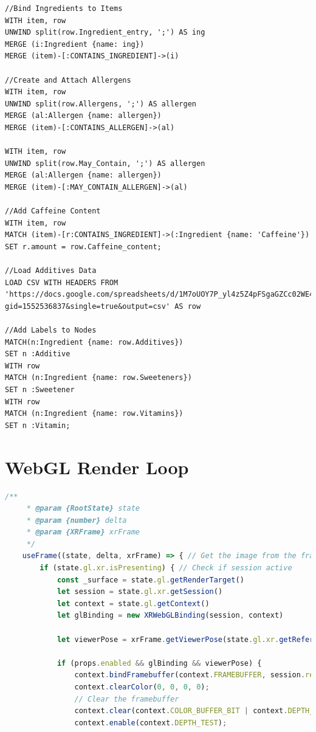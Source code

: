 \documentclass[thesis]{fputhesis}
\begin{document}
\begin{body}
\begin{appendices}
\begin{lstlisting}[language=Cypher]
//Bind Ingredients to Items
WITH item, row
UNWIND split(row.Ingredient_entry, ';') AS ing
MERGE (i:Ingredient {name: ing})
MERGE (item)-[:CONTAINS_INGREDIENT]->(i)

//Create and Attach Allergens
WITH item, row
UNWIND split(row.Allergens, ';') AS allergen
MERGE (al:Allergen {name: allergen})
MERGE (item)-[:CONTAINS_ALLERGEN]->(al)

WITH item, row
UNWIND split(row.May_Contain, ';') AS allergen
MERGE (al:Allergen {name: allergen})
MERGE (item)-[:MAY_CONTAIN_ALLERGEN]->(al)

//Add Caffeine Content
WITH item, row
MATCH (item)-[r:CONTAINS_INGREDIENT]->(:Ingredient {name: 'Caffeine'})
SET r.amount = row.Caffeine_content;

//Load Additives Data
LOAD CSV WITH HEADERS FROM 'https://docs.google.com/spreadsheets/d/1M7oUOY7P_yl4z5Z4pFSgaGZCc02WE4VKXe6nSkH_1LI/pub?gid=1552536837&single=true&output=csv' AS row

//Add Labels to Nodes
MATCH(n:Ingredient {name: row.Additives})
SET n :Additive
WITH row
MATCH (n:Ingredient {name: row.Sweeteners})
SET n :Sweetener
WITH row
MATCH (n:Ingredient {name: row.Vitamins})
SET n :Vitamin;
\end{lstlisting}

\section{WebGL Render Loop}
\begin{lstlisting}[language=Javascript]
    /**
     * @param {RootState} state
     * @param {number} delta
     * @param {XRFrame} xrFrame
     */
    useFrame((state, delta, xrFrame) => { // Get the image from the frame
        if (state.gl.xr.isPresenting) { // Check if session active
            const _surface = state.gl.getRenderTarget()
            let session = state.gl.xr.getSession()
            let context = state.gl.getContext()
            let glBinding = new XRWebGLBinding(session, context)

            let viewerPose = xrFrame.getViewerPose(state.gl.xr.getReferenceSpace())
            
            if (props.enabled && glBinding && viewerPose) {
                context.bindFramebuffer(context.FRAMEBUFFER, session.renderState.baseLayer.framebuffer);
                context.clearColor(0, 0, 0, 0);
                // Clear the framebuffer
                context.clear(context.COLOR_BUFFER_BIT | context.DEPTH_BUFFER_BIT);
                context.enable(context.DEPTH_TEST);


\end{lstlisting}
\end{appendices}
\end{body}
\end{document}
